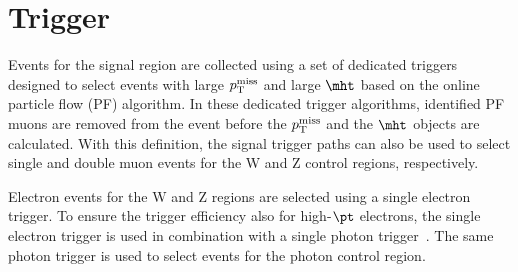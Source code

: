 \section{Trigger} 
\label{sec:trigger}

Events for the signal region are collected using a set of dedicated
triggers designed to select events with large $p_{\mathrm{T}}^{\mathrm{miss}}$ and large $\mht$ based on
the online particle flow (PF) algorithm. In these dedicated trigger algorithms,
identified PF muons are removed from the event before the
$p_{\mathrm{T}}^{\mathrm{miss}}$ and the $\mht$ objects are calculated. With this definition,
the signal trigger paths can also be used to select single and double muon events for the W and Z control regions, respectively.

Electron events for the W and Z regions are selected using a single electron trigger.
To ensure the trigger efficiency also for high-$\pt$ electrons, the single electron trigger is used in combination with
a single photon trigger~\cite{CMS-EGM-TWIKI-HLT}. The same photon trigger is used to select events for the photon control region.

